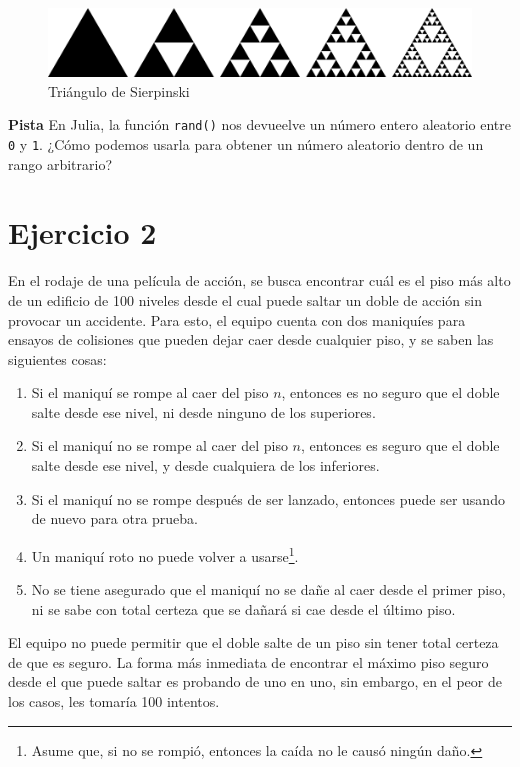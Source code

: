 \documentclass[a4paper]{article}
\begin{document}
\begin{figure}[h!]
    \centering
    \includegraphics[width=.8\linewidth]{img/sierp.png}
    \caption{Triángulo de Sierpinski}
    \label{fig:sierp_0}
\end{figure}

\textbf{Pista} En Julia, la función \texttt{rand()} nos devueelve un número entero aleatorio entre \texttt{0} y \texttt{1}. ¿Cómo podemos usarla para obtener un número aleatorio dentro de un rango arbitrario?

\newpage
\section*{Ejercicio 2} \label{Sec: Ejercicio 2}

En el rodaje de una película de acción, se busca encontrar cuál es el piso más alto de un edificio de 100 niveles desde el cual puede saltar un doble de acción sin provocar un accidente. Para esto, el equipo cuenta con dos maniquíes para ensayos de colisiones que pueden dejar caer desde cualquier piso, y se saben las siguientes cosas:

\begin{enumerate}
    \item Si el maniquí se rompe al caer del piso $n$, entonces es no seguro que el doble salte desde ese nivel, ni desde ninguno de los superiores.
    \item Si el maniquí no se rompe al caer del piso $n$, entonces es seguro que el doble salte desde ese nivel, y desde cualquiera de los inferiores.
    \item Si el maniquí no se rompe después de ser lanzado, entonces puede ser usando de nuevo para otra prueba.
    \item Un maniquí roto no puede volver a usarse\footnote{Asume que, si no se rompió, entonces la caída no le causó ningún daño.}.
    \item No se tiene asegurado que el maniquí no se dañe al caer desde el primer piso, ni se sabe con total certeza que se dañará si cae desde el último piso.
\end{enumerate}

El equipo no puede permitir que el doble salte de un piso sin tener total certeza de que es seguro. La forma más inmediata de encontrar el máximo piso seguro desde el que puede saltar es probando de uno en uno, sin embargo, en el peor de los casos, les tomaría 100 intentos. \\
\end{document}
